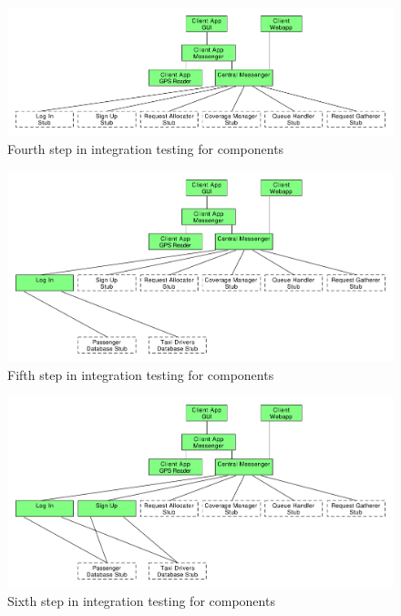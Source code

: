 \begin{figure}
\centering
\includegraphics[width=\textwidth]{tex-images/comp-4}
\caption{Fourth step in integration testing for components}
\end{figure}

\begin{figure}
\centering
\includegraphics[width=\textwidth]{tex-images/comp-5}
\caption{Fifth step in integration testing for components}
\end{figure}

\begin{figure}
\centering
\includegraphics[width=\textwidth]{tex-images/comp-6}
\caption{Sixth step in integration testing for components}
\end{figure}

